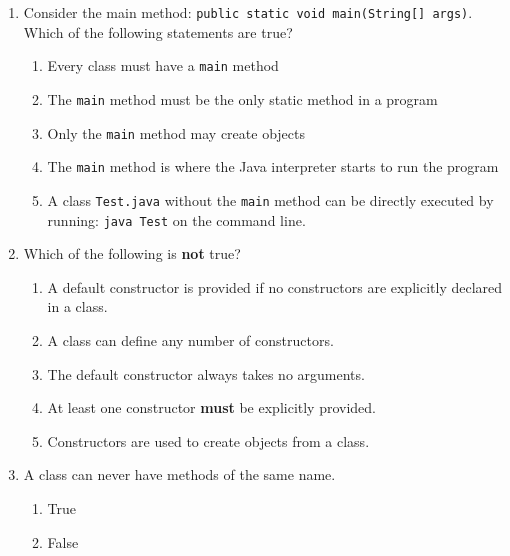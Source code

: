 \documentclass[CS180-S16-FinalExam.tex]{subfiles}
\begin{document}
\begin{enumerate}
\item Consider the main method: \texttt{public static void main(String[] args)}. Which of the following statements are true?
\begin{enumerate}
\item Every class must have a \texttt{main} method
\item The \texttt{main} method must be the only static method in a program
\item Only the \texttt{main} method may create objects
\item The \texttt{main} method is where the Java interpreter starts to run the program \ifdraft \Ans \fi
\item A class \texttt{Test.java} without the \texttt{main} method can be directly executed by running: \texttt{java Test} on the command line. 
\end{enumerate}

\clearpage
\item 
Which of the following is \textbf{not} true?
\begin{enumerate}
\item A default constructor is provided if no constructors are explicitly declared in a class. 
\item A class can define any number of constructors.
\item The default constructor always takes no arguments.  
\item  At least one constructor \textbf{must} be explicitly provided. \ifdraft \Ans \fi
\item Constructors are used to create objects from a class.
\end{enumerate}

\item
A class can never have methods of the same name.
\begin{enumerate}
\item True 
\item False \ifdraft \Ans \fi

\end{enumerate}





\end{enumerate}
\end{document}
